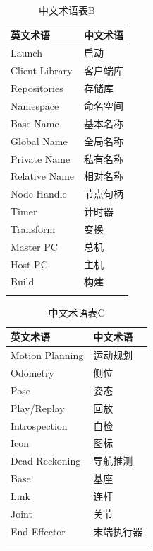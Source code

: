 \documentclass[geye,green,kindle,cn]{elegantnote}
\begin{document}
\begin{table}
    \centering
    \caption{中文术语表B} \label{table:ChineseTermTableB}
    \begin{tabular}{p{80pt}<{\centering}p{80pt}<{\centering}}
    \Xhline{1.0pt}
    \textbf{英文术语} & 
    \textbf{中文术语} \\
    \hline
    Launch &
    启动 \\
    Client Library &
    客户端库 \\
    Repositories &
    存储库 \\
    Namespace &
    命名空间 \\
    Base Name &
    基本名称 \\
    Global Name &
    全局名称 \\
    Private Name &
    私有名称 \\
    Relative Name &
    相对名称 \\
    Node Handle &
    节点句柄 \\
    Timer &
    计时器 \\
    Transform &
    变换 \\
    Master PC &
    总机 \\
    Host PC &
    主机 \\
    Build &
    构建 \\
    \Xhline{1.0pt}
    \end{tabular}
\end{table}

\begin{table}
    \centering
    \caption{中文术语表C} \label{table:ChineseTermTableC}
    \begin{tabular}{p{80pt}<{\centering}p{80pt}<{\centering}}
    \Xhline{1.0pt}
    \textbf{英文术语} & 
    \textbf{中文术语} \\
    \hline
    Motion Planning &
    运动规划 \\
    Odometry &
    侧位 \\
    Pose &
    姿态 \\
    Play/Replay &
    回放 \\
    Introspection &
    自检 \\
    Icon &
    图标 \\
    Dead Reckoning &
    导航推测 \\
    Base &
    基座 \\
    Link &
    连杆 \\
    Joint &
    关节 \\
    End Effector &
    末端执行器 \\
    \Xhline{1.0pt}
    \end{tabular}
\end{table}
\end{document}
